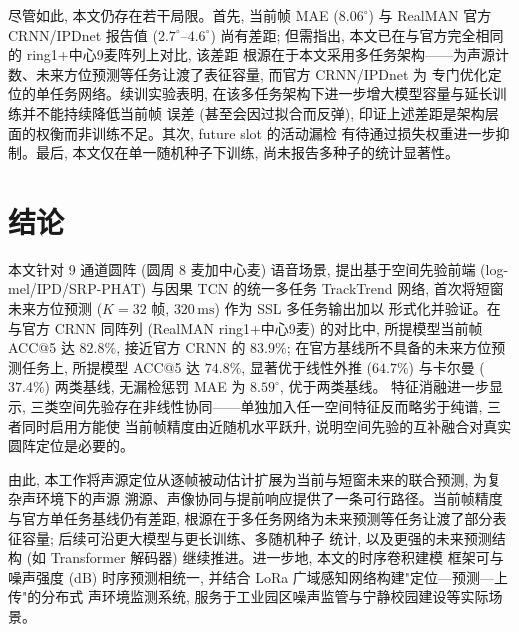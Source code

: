 \documentclass[UTF8,a4paper,11pt]{ctexart}
\begin{document}
尽管如此, 本文仍存在若干局限。首先, 当前帧 MAE ($8.06^\circ$) 与 RealMAN 官方 CRNN/IPDnet 报告值
($2.7^\circ$--$4.6^\circ$) 尚有差距; 但需指出, 本文已在与官方完全相同的 ring1+中心9麦阵列上对比, 该差距
根源在于本文采用多任务架构——为声源计数、未来方位预测等任务让渡了表征容量, 而官方 CRNN/IPDnet 为
专门优化定位的单任务网络。续训实验表明, 在该多任务架构下进一步增大模型容量与延长训练并不能持续降低当前帧
误差 (甚至会因过拟合而反弹), 印证上述差距是架构层面的权衡而非训练不足。其次, future slot 的活动漏检
有待通过损失权重进一步抑制。最后, 本文仅在单一随机种子下训练, 尚未报告多种子的统计显著性。

\section{结论}

本文针对 9 通道圆阵 (圆周 8 麦加中心麦) 语音场景, 提出基于空间先验前端 (log-mel/IPD/SRP-PHAT) 与因果 TCN 的统一多任务
TrackTrend 网络, 首次将短窗未来方位预测 ($K{=}32$ 帧, $320\,\mathrm{ms}$) 作为 SSL 多任务输出加以
形式化并验证。在与官方 CRNN 同阵列 (RealMAN ring1+中心9麦) 的对比中, 所提模型当前帧 ACC@5 达 $82.8\%$,
接近官方 CRNN 的 $83.9\%$; 在官方基线所不具备的未来方位预测任务上, 所提模型 ACC@5 达 $74.8\%$,
显著优于线性外推 ($64.7\%$) 与卡尔曼 ($37.4\%$) 两类基线, 无漏检惩罚 MAE 为 $8.59^\circ$, 优于两类基线。
特征消融进一步显示, 三类空间先验存在非线性协同——单独加入任一空间特征反而略劣于纯谱, 三者同时启用方能使
当前帧精度由近随机水平跃升, 说明空间先验的互补融合对真实圆阵定位是必要的。

由此, 本工作将声源定位从逐帧被动估计扩展为当前与短窗未来的联合预测, 为复杂声环境下的声源
溯源、声像协同与提前响应提供了一条可行路径。当前帧精度与官方单任务基线仍有差距,
根源在于多任务网络为未来预测等任务让渡了部分表征容量; 后续可沿更大模型与更长训练、多随机种子
统计, 以及更强的未来预测结构 (如 Transformer 解码器) 继续推进。进一步地, 本文的时序卷积建模
框架可与噪声强度 (dB) 时序预测相统一, 并结合 LoRa 广域感知网络构建"定位—预测—上传"的分布式
声环境监测系统, 服务于工业园区噪声监管与宁静校园建设等实际场景。



\end{document}
